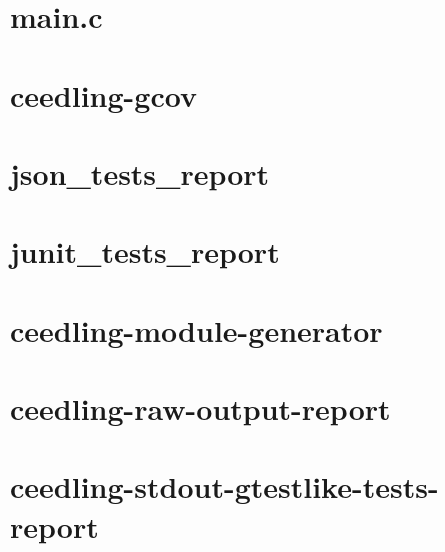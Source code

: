 \documentclass[twoside]{book}
\newcommand{\+}{\discretionary{\mbox{\scriptsize$\hookleftarrow$}}{}{}}
\begin{document}
\chapter{main.\+c}
\label{_main_c}

\chapter{ceedling-\/gcov}
\label{md_muju_vendor_ceedling_plugins_gcov__r_e_a_d_m_e}

\chapter{json\+\_\+tests\+\_\+report}
\label{md_muju_vendor_ceedling_plugins_json_tests_report__r_e_a_d_m_e}

\chapter{junit\+\_\+tests\+\_\+report}
\label{md_muju_vendor_ceedling_plugins_junit_tests_report__r_e_a_d_m_e}

\chapter{ceedling-\/module-\/generator}
\label{md_muju_vendor_ceedling_plugins_module_generator__r_e_a_d_m_e}

\chapter{ceedling-\/raw-\/output-\/report}
\label{md_muju_vendor_ceedling_plugins_raw_output_report__r_e_a_d_m_e}

\chapter{ceedling-\/stdout-\/gtestlike-\/tests-\/report}
\label{md_muju_vendor_ceedling_plugins_stdout_gtestlike_tests_report__r_e_a_d_m_e}

\end{document}
